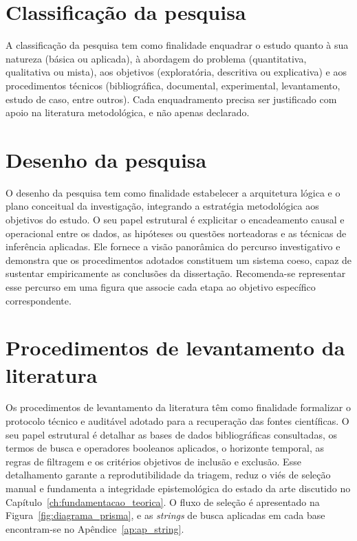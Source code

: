 \section{Classificação da pesquisa}
\label{sec:classificacao}
A classificação da pesquisa tem como finalidade enquadrar o estudo quanto à sua natureza (básica ou aplicada), à abordagem do problema (quantitativa, qualitativa ou mista), aos objetivos (exploratória, descritiva ou explicativa) e aos procedimentos técnicos (bibliográfica, documental, experimental, levantamento, estudo de caso, entre outros). Cada enquadramento precisa ser justificado com apoio na literatura metodológica, e não apenas declarado.

\section{Desenho da pesquisa}
\label{sec:desenho_pesquisa}
O desenho da pesquisa tem como finalidade estabelecer a arquitetura lógica e o plano conceitual da investigação, integrando a estratégia metodológica aos objetivos do estudo. O seu papel estrutural é explicitar o encadeamento causal e operacional entre os dados, as hipóteses ou questões norteadoras e as técnicas de inferência aplicadas. Ele fornece a visão panorâmica do percurso investigativo e demonstra que os procedimentos adotados constituem um sistema coeso, capaz de sustentar empiricamente as conclusões da dissertação. Recomenda-se representar esse percurso em uma figura que associe cada etapa ao objetivo específico correspondente.

\section{Procedimentos de levantamento da literatura}
\label{sec:procedimentos_literatura}
Os procedimentos de levantamento da literatura têm como finalidade formalizar o protocolo técnico e auditável adotado para a recuperação das fontes científicas. O seu papel estrutural é detalhar as bases de dados bibliográficas consultadas, os termos de busca e operadores booleanos aplicados, o horizonte temporal, as regras de filtragem e os critérios objetivos de inclusão e exclusão. Esse detalhamento garante a reprodutibilidade da triagem, reduz o viés de seleção manual e fundamenta a integridade epistemológica do estado da arte discutido no Capítulo~\ref{ch:fundamentacao_teorica}. O fluxo de seleção é apresentado na Figura~\ref{fig:diagrama_prisma}, e as \textit{strings} de busca aplicadas em cada base encontram-se no Apêndice~\ref{ap:ap_string}.

